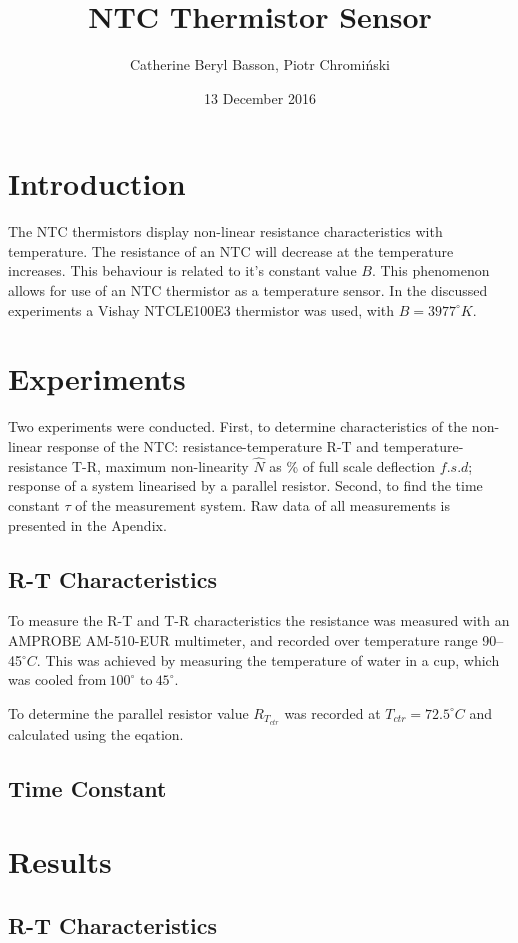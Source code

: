 \documentclass[a4,11pt]{article}
\begin{document}
\title{NTC Thermistor Sensor}
\author{Catherine Beryl Basson, Piotr Chromi\'nski}
\date{13 December 2016}
\maketitle
\twocolumn
\section{Introduction}

The NTC thermistors display non-linear resistance characteristics with temperature. The resistance of an NTC will decrease at the temperature increases. This behaviour is related to it's constant value $B$. This phenomenon allows for use of an NTC thermistor as a temperature sensor. In the discussed experiments a Vishay NTCLE100E3 thermistor was used, with $B=3977^{\circ}K$.

\section{Experiments}
Two experiments were conducted. First, to determine characteristics of the non-linear response of the NTC: resistance-temperature R-T and temperature-resistance T-R, maximum non-linearity $\hat N$ as \% of full scale deflection $f.s.d$; response of a system linearised by a parallel resistor. Second, to find the time constant $\tau$ of the measurement system. Raw data of all measurements is presented in the Apendix.
\subsection{R-T Characteristics}

To measure the R-T and T-R characteristics the resistance was measured with an AMPROBE AM-510-EUR multimeter, and recorded over temperature range 90--45$^{\circ}C$. This was achieved by measuring the temperature of water in a cup, which was cooled from$~100^{\circ}$ to$~45^{\circ}$.

To determine the parallel resistor value $R_{T_{ctr}}$ was recorded at $T_{ctr}=72.5^{\circ}C$ and calculated using the eqation.
\subsection{Time Constant}
\section{Results}
\subsection{R-T Characteristics}
\end{document}
